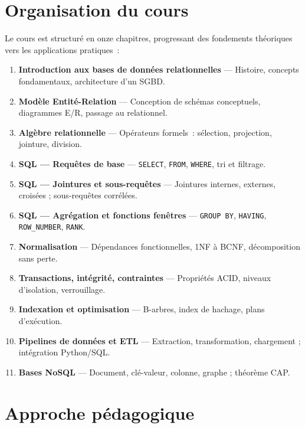 \section*{Organisation du cours}

Le cours est structur\'e en onze chapitres, progressant des fondements th\'eoriques
vers les applications pratiques~:

\begin{enumerate}
    \item \textbf{Introduction aux bases de donn\'ees relationnelles} ---
          Histoire, concepts fondamentaux, architecture d'un SGBD.
    \item \textbf{Mod\`ele Entit\'e-Relation} ---
          Conception de sch\'emas conceptuels, diagrammes E/R, passage au relationnel.
    \item \textbf{Alg\`ebre relationnelle} ---
          Op\'erateurs formels~: s\'election, projection, jointure, division.
    \item \textbf{SQL --- Requ\^etes de base} ---
          \texttt{SELECT}, \texttt{FROM}, \texttt{WHERE}, tri et filtrage.
    \item \textbf{SQL --- Jointures et sous-requ\^etes} ---
          Jointures internes, externes, crois\'ees ; sous-requ\^etes corr\'el\'ees.
    \item \textbf{SQL --- Agr\'egation et fonctions fen\^etres} ---
          \texttt{GROUP BY}, \texttt{HAVING}, \texttt{ROW\_NUMBER}, \texttt{RANK}.
    \item \textbf{Normalisation} ---
          D\'ependances fonctionnelles, 1NF \`a BCNF, d\'ecomposition sans perte.
    \item \textbf{Transactions, int\'egrit\'e, contraintes} ---
          Propri\'et\'es ACID, niveaux d'isolation, verrouillage.
    \item \textbf{Indexation et optimisation} ---
          B-arbres, index de hachage, plans d'ex\'ecution.
    \item \textbf{Pipelines de donn\'ees et ETL} ---
          Extraction, transformation, chargement ; int\'egration Python/SQL.
    \item \textbf{Bases NoSQL} ---
          Document, cl\'e-valeur, colonne, graphe ; th\'eor\`eme CAP.
\end{enumerate}

\section*{Approche p\'edagogique}

